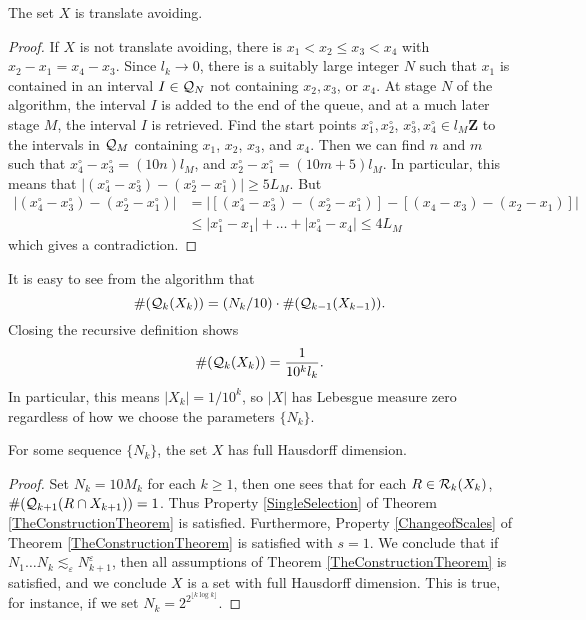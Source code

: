 \begin{lemma}
    The set $X$ is translate avoiding.
\end{lemma}
\begin{proof}
    If $X$ is not translate avoiding, there is $x_1 < x_2 \leq x_3 < x_4$ with $x_2 - x_1 = x_4 - x_3$. Since $l_k \to 0$, there is a suitably large integer $N$ such that $x_1$ is contained in an interval $I \in \operatorname{\mathcal{Q}}_N$ not containing $x_2,x_3$, or $x_4$. At stage $N$ of the algorithm, the interval $I$ is added to the end of the queue, and at a much later stage $M$, the interval $I$ is retrieved. Find the start points $x_1^\circ, x_2^\circ$, $x_3^\circ, x_4^\circ \in l_M \mathbf{Z}$ to the intervals in $\operatorname{\mathcal{Q}}_M$ containing $x_1$, $x_2$, $x_3$, and $x_4$. Then we can find $n$ and $m$ such that $x_4^\circ - x_3^\circ = (10n)l_M$, and $x_2^\circ - x_1^\circ = (10m + 5)l_M$. In particular, this means that $|(x_4^\circ - x_3^\circ) - (x_2^\circ - x_1^\circ)| \geq 5L_M$. But
    \begin{align*}
        |(x_4^\circ - x_3^\circ) - (x_2^\circ - x_1^\circ)| &= |[(x_4^\circ - x_3^\circ) - (x_2^\circ - x_1^\circ)] - [(x_4 - x_3) - (x_2 - x_1)]|\\
        &\leq |x_1^\circ - x_1| + \dots + |x_4^\circ - x_4| \leq 4 L_M
    \end{align*}
    which gives a contradiction.
\end{proof}

It is easy to see from the algorithm that
%
\[ \# (\operatorname{\mathcal{Q}}_k(X_k)) = (N_k/10) \cdot \#(\operatorname{\mathcal{Q}}_{k-1}(X_{k-1})). \]
%
Closing the recursive definition shows
%
\[ \#(\operatorname{\mathcal{Q}}_k(X_k)) = \frac{1}{10^k l_k}. \]
%
In particular, this means $|X_k| = 1/10^k$, so $|X|$ has Lebesgue measure zero regardless of how we choose the parameters $\{ N_k \}$. 

\begin{theorem}
    For some sequence $\{ N_k \}$, the set $X$ has full Hausdorff dimension.
\end{theorem}
\begin{proof}
    Set $N_k = 10 M_k$ for each $k \geq 1$, then one sees that for each $R \in \operatorname{\mathcal{R}}_k(X_k)$, $\#(\operatorname{\mathcal{Q}}_{k+1}(R \cap X_{k+1})) = 1$. Thus Property \ref{SingleSelection} of Theorem \ref{TheConstructionTheorem} is satisfied. Furthermore, Property \ref{ChangeofScales} of Theorem \ref{TheConstructionTheorem} is satisfied with $s = 1$. We conclude that if $N_1 \dots N_k \lesssim_\varepsilon N_{k+1}^\varepsilon$, then all assumptions of Theorem \ref{TheConstructionTheorem} is satisfied, and we conclude $X$ is a set with full Hausdorff dimension. This is true, for instance, if we set $N_k = 2^{2^{\lfloor k \log k \rfloor}}$.
\end{proof}

